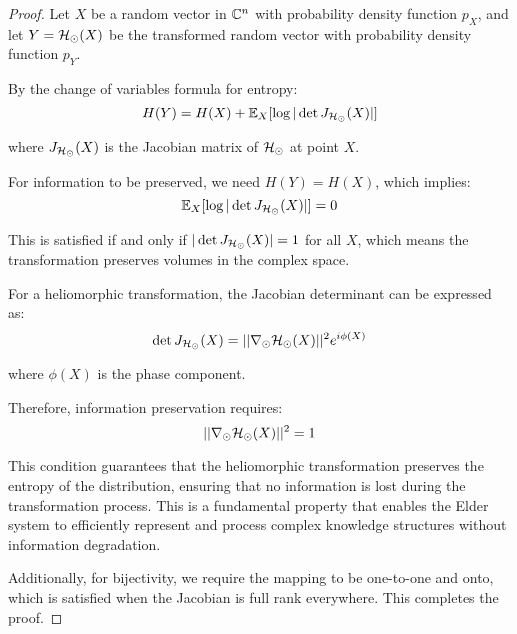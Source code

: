 \begin{proof}
Let $X$ be a random vector in $\mathbb{C}^n$ with probability density function $p_X$, and let $Y = \mathcal{H}_{\odot}(X)$ be the transformed random vector with probability density function $p_Y$.

By the change of variables formula for entropy:
\begin{equation}
H(Y) = H(X) + \mathbb{E}_X[\log |\det J_{\mathcal{H}_{\odot}}(X)|]
\end{equation}

where $J_{\mathcal{H}_{\odot}}(X)$ is the Jacobian matrix of $\mathcal{H}_{\odot}$ at point $X$.

For information to be preserved, we need $H(Y) = H(X)$, which implies:
\begin{equation}
\mathbb{E}_X[\log |\det J_{\mathcal{H}_{\odot}}(X)|] = 0
\end{equation}

This is satisfied if and only if $|\det J_{\mathcal{H}_{\odot}}(X)| = 1$ for all $X$, which means the transformation preserves volumes in the complex space.

For a heliomorphic transformation, the Jacobian determinant can be expressed as:
\begin{equation}
\det J_{\mathcal{H}_{\odot}}(X) = ||\nabla_{\odot} \mathcal{H}_{\odot}(X)||^2 e^{i\phi(X)}
\end{equation}

where $\phi(X)$ is the phase component.

Therefore, information preservation requires:
\begin{equation}
||\nabla_{\odot} \mathcal{H}_{\odot}(X)||^2 = 1
\end{equation}

This condition guarantees that the heliomorphic transformation preserves the entropy of the distribution, ensuring that no information is lost during the transformation process. This is a fundamental property that enables the Elder system to efficiently represent and process complex knowledge structures without information degradation.

Additionally, for bijectivity, we require the mapping to be one-to-one and onto, which is satisfied when the Jacobian is full rank everywhere. This completes the proof.
\end{proof}